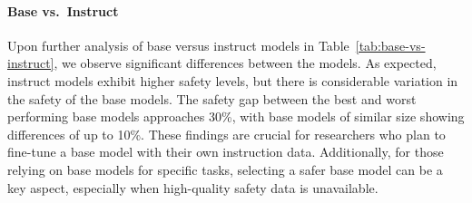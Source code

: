 \paragraph{Base vs.~Instruct} Upon further analysis of base versus instruct models in Table~\ref{tab:base-vs-instruct}, we observe significant differences between the models. As expected, instruct models exhibit higher safety levels, but there is considerable variation in the safety of the base models. The safety gap between the best and worst performing base models approaches 30\%, with base models of similar size showing differences of up to 10\%. These findings are crucial for researchers who plan to fine-tune a base model with their own instruction data. Additionally, for those relying on base models for specific tasks, selecting a safer base model can be a key aspect, especially when high-quality safety data is unavailable.

